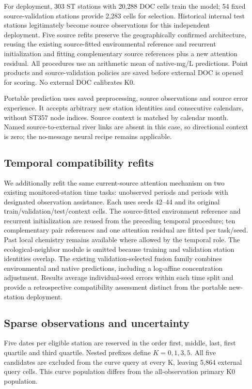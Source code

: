 \documentclass[11pt]{article}
\begin{document}
For deployment, 303 ST stations with 20,288 DOC cells train the model; 54 fixed source-validation stations provide 2,283 cells for selection. Historical internal test stations legitimately become source observations for this independent deployment. Five source refits preserve the geographically confirmed architecture, reusing the existing source-fitted environmental reference and recurrent initialization and fitting complementary source references plus a new attention residual. All procedures use an arithmetic mean of native-mg/L predictions. Point products and source-validation policies are saved before external DOC is opened for scoring. No external DOC calibrates K0.

Portable prediction uses saved preprocessing, source observations and source error experience. It accepts arbitrary new station identities and consecutive calendars, without ST357 node indices. Source context is matched by calendar month. Named source-to-external river links are absent in this case, so directional context is zero; the no-message neural recipe remains applicable.

\subsection{Temporal compatibility refits}
We additionally refit the same current-source attention mechanism on two existing monitored-station time tasks: unobserved periods and periods with designated observation assistance. Each uses seeds 42--44 and its original train/validation/test/context cells. The source-fitted environment reference and recurrent initialization are reused from the preceding temporal procedure; ten complementary pair references and one attention residual are fitted per task/seed. Past local chemistry remains available where allowed by the temporal role. The ecological-neighbor module is omitted because training and validation station identities overlap. The existing validation-selected fusion family combines environmental and native predictions, including a log-affine concentration adjustment. Results average individual-seed errors within each time split and provide a retrospective compatibility assessment distinct from the portable new-station deployment.

\subsection{Sparse observations and uncertainty}
Five dates per eligible station are reserved in the order first, middle, last, first quartile and third quartile. Nested prefixes define $K=0, 1, 3, 5$. All five candidates are excluded from the curve query at every K, leaving 5,864 external query cells. This curve population differs from the all-observation primary K0 population.
\end{document}
